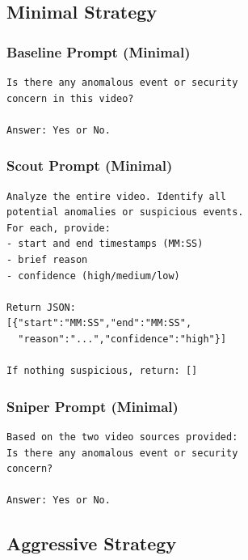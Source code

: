 \documentclass[letterpaper]{article}
\begin{document}
\subsection{Minimal Strategy}

\subsubsection{Baseline Prompt (Minimal)}
\begin{small}
\begin{verbatim}
Is there any anomalous event or security
concern in this video?

Answer: Yes or No.
\end{verbatim}
\end{small}

\subsubsection{Scout Prompt (Minimal)}
\begin{small}
\begin{verbatim}
Analyze the entire video. Identify all
potential anomalies or suspicious events.
For each, provide:
- start and end timestamps (MM:SS)
- brief reason
- confidence (high/medium/low)

Return JSON:
[{"start":"MM:SS","end":"MM:SS",
  "reason":"...","confidence":"high"}]

If nothing suspicious, return: []
\end{verbatim}
\end{small}

\subsubsection{Sniper Prompt (Minimal)}
\begin{small}
\begin{verbatim}
Based on the two video sources provided:
Is there any anomalous event or security
concern?

Answer: Yes or No.
\end{verbatim}
\end{small}

\subsection{Aggressive Strategy}
\end{document}
